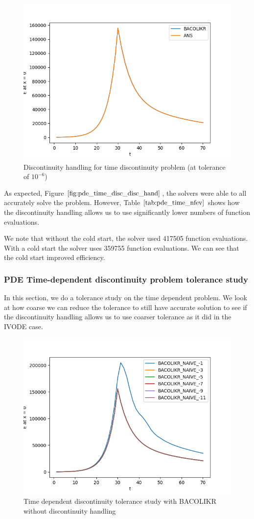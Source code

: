 \documentclass{article}
\begin{document}
\begin{figure}[H]
\centering
\includegraphics[width=0.7\linewidth]{./figures/pde_time_disc_disc_hand}
\caption{Discontinuity handling for time discontinuity problem (at tolerance of $10^{-6}$)}
\label{fig:pde_time_disc_disc_hand}
\end{figure}

As expected, Figure $\ref{fig:pde_time_disc_disc_hand}$, the solvers were able to all accurately solve the problem. However, Table $\ref{tab:pde_time_nfev}$ shows how the discontinuity handling allows us to use significantly lower numbers of function evaluations.

We note that without the cold start, the solver used 417505 function evaluations. With a cold start the solver uses 359755 function evaluations. We can see that the cold start improved efficiency.

\subsubsection{PDE Time-dependent discontinuity problem tolerance study}
\label{subsubsection:pde_time_tol}
In this section, we do a tolerance study on the time dependent problem. We look at how coarse we can reduce the tolerance to still have accurate solution to see if the discontinuity handling allows us to use coarser tolerance as it did in the IVODE case.

\begin{figure}[H]
\centering
\includegraphics[width=0.7\linewidth]{./figures/pde_time_disc_bacolikr_naive_tol}
\caption{Time dependent discontinuity tolerance study with BACOLIKR without discontinuity handling}
\label{fig:pde_time_disc_bacolikr_naive_tol}
\end{figure}
\end{document}
